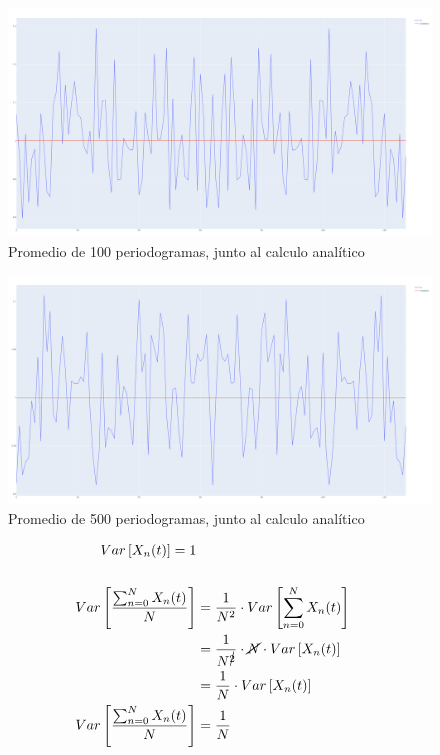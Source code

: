 \documentclass[12pt,letterpaper]{article}     %
\begin{document}
\begin{figure}[!ht]
\centering
\includegraphics[width=18cm]{imagenes/PromedioN100.png}
\caption{Promedio de 100 periodogramas, junto al calculo analítico}
\end{figure}

\begin{figure}[!ht]
\centering
\includegraphics[width=18cm]{imagenes/PromedioN500.png}
\caption{Promedio de 500 periodogramas, junto al calculo analítico}
\end{figure}

\clearpage
\begin{equation*}
	\begin{split}
		Var \left[X_n(t)\right]=1\\
		\\
		Var\left[\frac{\sum_{n=0}^{N}X_n(t)}{N}\right]&=\frac{1}{N^2}\cdot Var\left[\sum_{n=0}^{N}X_n(t)\right]\\
		&=\frac{1}{N^{\cancel{2}}}\cdot \cancel{N}\cdot Var\left[X_n(t)\right]\\
		&=\frac{1}{N}\cdot Var\left[X_n(t)\right]\\
		Var\left[\frac{\sum_{n=0}^{N}X_n(t)}{N}\right]&=\frac{1}{N}
	\end{split}
\end{equation*}
\end{document}
